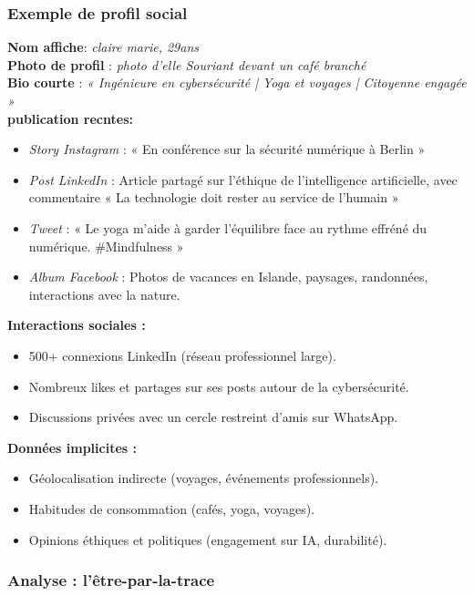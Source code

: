\documentclass[12pt,a4paper]{article}
\begin{document}
	     \subsubsection{Exemple de profil social}
	     \textbf{Nom affiche}: \emph{claire marie, 29ans}\\
	     \textbf{Photo de profil} : \emph{photo d'elle Souriant devant un café branché}\\
	     \textbf{Bio courte} : \emph{« Ingénieure en cybersécurité  | Yoga et voyages | Citoyenne engagée »}\\
	     \textbf{publication recntes:}
	     \begin{itemize}
	     	\item \emph{Story Instagram} : « En conférence sur la sécurité numérique à Berlin »
	     	\item \emph{Post LinkedIn} : Article partagé sur l’éthique de l’intelligence artificielle, avec commentaire « La technologie doit rester au service de l’humain  »
	     	\item \emph{Tweet} : « Le yoga m’aide à garder l’équilibre face au rythme effréné du numérique. \#Mindfulness »
	     	\item \emph{Album Facebook }: Photos de vacances en Islande, paysages, randonnées, interactions avec la nature.
	    \end{itemize}
	    \textbf{Interactions sociales :}
	    	\begin{itemize}
	    		\item 500+ connexions LinkedIn (réseau professionnel large).
	    		\item Nombreux likes et partages sur ses posts autour de la cybersécurité.
	    		\item Discussions privées avec un cercle restreint d’amis sur WhatsApp.
	    	\end{itemize}
	    
	     \textbf{Données implicites :}
	        	\begin{itemize}
					\item Géolocalisation indirecte (voyages, événements professionnels).
	 				\item Habitudes de consommation (cafés, yoga, voyages).
	                \item Opinions éthiques et politiques (engagement sur IA, durabilité).
				\end{itemize}
	     \subsubsection{Analyse : l’être-par-la-trace}	
	     
\end{document}
